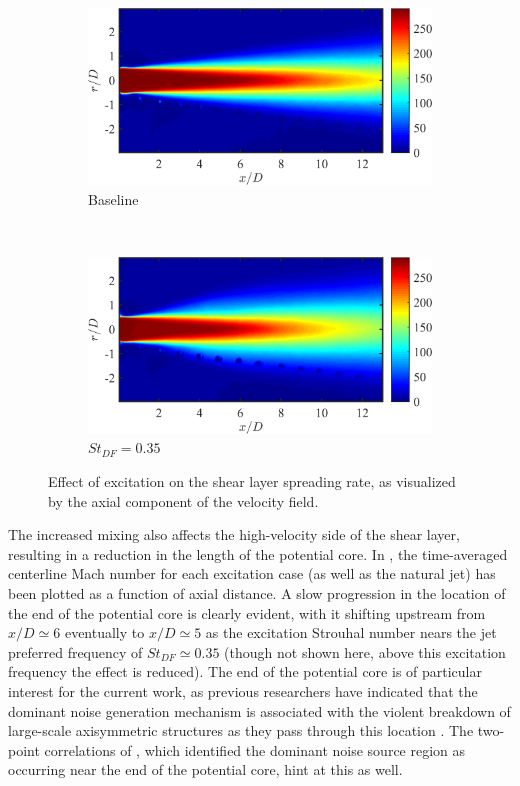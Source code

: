 \begin{figure}
	\centering
	\begin{subfigure}{0.75\textwidth}
		\centering
		\includegraphics[width=0.95\linewidth]{Figures/ch4_St000_Um.png}
		\caption{Baseline}
	\end{subfigure}\\
	\begin{subfigure}{0.75\textwidth}
		\centering
		\includegraphics[width=0.95\linewidth]{Figures/ch4_St035_Um.png}
		\caption{$St_{DF} = 0.35$}
	\end{subfigure}
	\caption{Effect of excitation on the shear layer spreading rate, as visualized by the axial component of the velocity field.}
	\label{fig:ch4_shearlayerspreading}
\end{figure}

The increased mixing also affects the high-velocity side of the shear layer, resulting in a reduction in the length of the potential core.
In , the time-averaged centerline Mach number for each excitation case (as well as the natural jet) has been plotted as a function of axial distance.
A slow progression in the location of the end of the potential core is clearly evident, with it shifting upstream from $x/D \simeq 6$ eventually to $x/D \simeq 5$ as the excitation Strouhal number nears the jet preferred frequency of $St_{DF} \simeq 0.35$ (though not shown here, above this excitation frequency the effect is reduced).
The end of the potential core is of particular interest for the current work, as previous researchers have indicated that the dominant noise generation mechanism is associated with the violent breakdown of large-scale axisymmetric structures as they pass through this location \citep{Hileman2005}.
The two-point correlations of , which identified the dominant noise source region as occurring near the end of the potential core, hint at this as well.

